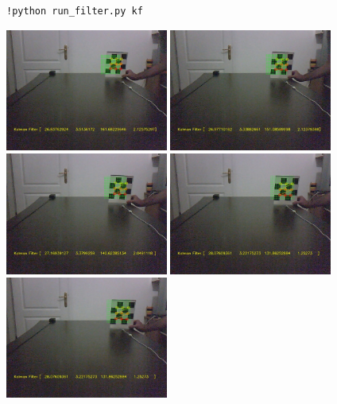\documentclass[12pt,fleqn]{article}\usepackage{../common}
\begin{document}
\inputminted{python}{kalman_3d.py}

\inputminted{python}{run_filter.py}

\begin{verbatim}
!python run_filter.py kf
\end{verbatim}

\includegraphics[height=4cm]{cb-kf-1.jpg}
\includegraphics[height=4cm]{cb-kf-2.jpg}
\includegraphics[height=4cm]{cb-kf-3.jpg}
\includegraphics[height=4cm]{cb-kf-4.jpg}
\includegraphics[height=4cm]{cb-kf-4.jpg}
\end{document}
